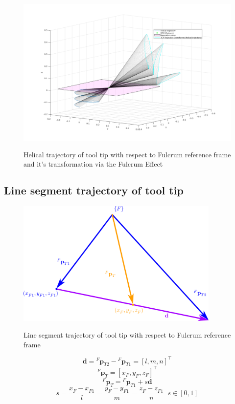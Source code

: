 \begin{center}
\begin{figure}[!htb]
\centering
\includegraphics[width=\textwidth]{images/rcm_trajectories/rcm_helical_traj.png}\\
\caption{Helical trajectory of tool tip with respect to Fulcrum reference frame and it's transformation via the Fulcrum Effect}
\end{figure}
\end{center}

\subsection{Line segment trajectory of tool tip}

\begin{center}
\begin{figure}[!htb]
\centering
\includegraphics[width=10cm]{images/line-segment-trajectory-wrt-fulcrum.png}\\
\caption{Line segment trajectory of tool tip with respect to Fulcrum reference frame}
\end{figure}
\end{center}
\[
\mathbf{d} = {}^{F}\mathbf{p}^{}_{T2} - {}^{F}\mathbf{p}^{}_{T1} = [l, m, n]^\top
\]
\[
{}^{F}\mathbf{p}^{}_{T} = [x^{}_{F}, y^{}_{F}, z^{}_{F}]^\top
\]
\[
{}^{F}\mathbf{p}^{}_{T} = {}^{F}\mathbf{p}^{}_{T1} + s\mathbf{d}
\]
\[
s = \frac{x^{}_{F} - x^{}_{F1}}{l} = \frac{y^{}_{F} - y^{}_{F1}}{m} = \frac{z^{}_{F} - z^{}_{F1}}{n} \;\; s \in [0, 1]
\]

